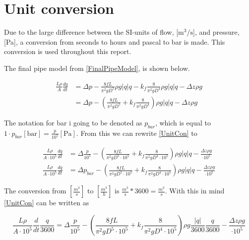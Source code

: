 \section{Unit conversion}
\label{unitCON}

Due to the large difference between the SI-units of flow, [$\text{m}^3/\text{s}$], and pressure, [Pa], a conversion from seconds to hours and pascal to bar is made. This conversion is used throughout this report. 

The final pipe model from \eqref{FinalPipeModel}, is shown below.   

\begin{equation}
\begin{split}
   \frac{L \rho}{A} \frac{dq}{dt} &=\Delta p - \frac{8fL}{\pi^{2}gD^5} \rho g  |q| q - k_f \frac{8}{\pi^2gD^4} \rho g |q| q - \Delta z \rho g \\
   &=\Delta p - (\frac{8fL}{\pi^{2}gD^5} + k_f \frac{8}{\pi^2gD^4}) \rho g |q| q - \Delta z \rho g
\end{split}
\label{UnitCon_eq}
\end{equation}

The notation for bar i going to be denoted as $p_{bar}$, which is equal to $1\cdot p_{bar}[\text{bar}] = \frac{p}{10^5}[\text{Pa}]$. From this we can rewrite \eqref{UnitCon} to 

\begin{equation}
\begin{split}
   \frac{L \rho}{A\cdot10^5} \frac{dq}{dt} &= \Delta \frac{p}{10^5} - (\frac{8fL}{\pi^{2}gD^5\cdot10^5} + k_f \frac{8}{\pi^2gD^4\cdot10^5}) \rho g |q| q - \frac{\Delta z \rho g}{\cdot10^5}\\
   \frac{L \rho}{A\cdot10^5} \frac{dq}{dt} &= \Delta p_{bar} - (\frac{8fL}{\pi^{2}gD^5\cdot10^5} + k_f \frac{8}{\pi^2gD^4\cdot10^5}) \rho g |q| q - \frac{\Delta z \rho g}{\cdot10^5}
\end{split}
\end{equation}

The conversion from $[\frac{m^3}{s}]$ to $[\frac{m^3}{h}]$ is $\frac{m^3}{s}*3600 = \frac{m^3}{s}$. With this in mind \eqref{UnitCon} can be written as 

\begin{equation}
   \frac{L \rho}{A\cdot10^5} \frac{d}{dt}\frac{q}{3600} = \Delta \frac{p}{10^5} - (\frac{8fL}{\pi^{2}gD^5\cdot10^5} + k_f \frac{8}{\pi^2gD^4\cdot10^5}) \rho g \frac{|q|}{3600} \frac{q}{3600} - \frac{\Delta z \rho g}{\cdot10^5}
\end{equation}
